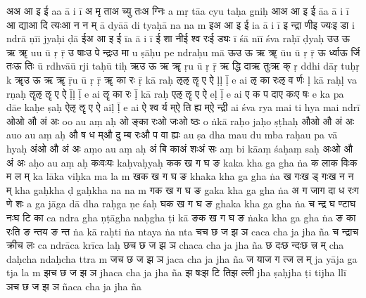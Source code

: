 \documentclass{article}
\begin{document}
\card
{अ}{अ आ इ ई}%
{a}{a ā i ī}
{{अ मृ ता}{अ च्यु तः}{अ ग्निः}}%
{{a mṛ tā}{a cyu taḥ}{a gniḥ}}
\card
{आ}{अ आ इ ई}%
{ā}{a ā i ī}
{{आ द्या}{आ दि त्यः}{आ न न म्}}%
{{ā dyā}{ā di tyaḥ}{ā na na m}}
\card
{इ}{अ आ इ ई}%
{i}{a ā i ī}
{{इ न्द्रा णी}{इ ज्यः}{इ डा}}%
{{i ndrā ṇī}{i jyaḥ}{i ḍā}}
\card
{ई}{अ आ इ ई}%
{ī}{a ā i ī}
{{ई शा नी}{ई श्व रः}{ई ड्यः}}%
{{ī śā nī}{ī śva raḥ}{ī ḍyaḥ}}
\card
{उ}{उ ऊ ऋ ॠ}%
{u}{u ū ṛ ṝ}
{{उ षाः}{उ पे न्द्रः}{उ मा}}%
{{u ṣāḥ}{u pe ndraḥ}{u mā}}
\card
{ऊ}{उ ऊ ऋ ॠ}%
{ū}{u ū ṛ ṝ}
{{ऊ र्ध्वा}{ऊ र्जि तः}{ऊ तिः}}%
{{ū rdhvā}{ū rji taḥ}{ū tiḥ}}
\card
{ऋ}{उ ऊ ऋ ॠ}%
{ṛ}{u ū ṛ ṝ}
{{ऋ द्धि दा}{ऋ तुः}{ऋ क्}}%
{{ṛ ddhi dā}{ṛ tuḥ}{ṛ k}}
\card
{ॠ}{उ ऊ ऋ ॠ}%
{ṝ}{u ū ṛ ṝ}
{{ॠ का रः}{ }{ }}%
{{ṝ kā raḥ}{ }{ }}
\card
{ऌ}{ऌ ॡ ए ऐ}%
{ḷ}{ḷ ḹ e ai}
{{ऌ का रः}{ऌ व र्णः}{ }}%
{{ḷ kā raḥ}{ḷ va rṇaḥ}{ }}
\card
{ॡ}{ऌ ॡ ए ऐ}%
{ḹ}{ḷ ḹ e ai}
{{ॡ का रः}{ }{ }}%
{{ḹ kā raḥ}{ }{ }}
\card
{ए}{ऌ ॡ ए ऐ}%
{e}{ḷ ḹ e ai}
{{ए क प दा}{ए कः}{ए षः}}%
{{e ka pa dā}{e kaḥ}{e ṣaḥ}}
\card
{ऐ}{ऌ ॡ ए ऐ}%
{ai}{ḷ ḹ e ai}
{{ऐ श्व र्य म्}{ऐ ति ह्य म्}{ऐ न्द्री}}%
{{ai śva rya m}{ai ti hya m}{ai ndrī}}
\card
{ओ}{ओ औ अं अः}%
{o}{o au aṃ aḥ}
{{ओ ङ्का रः}{ओ जः}{ओ ष्ठः}}%
{{o ṅkā raḥ}{o jaḥ}{o ṣṭhaḥ}}
\card
{औ}{ओ औ अं अः}%
{au}{o au aṃ aḥ}
{{औ ष ध म्}{औ दु म्ब रः}{औ प वा ह्यः}}%
{{au ṣa dha m}{au du mba raḥ}{au pa vā hyaḥ}}
\card
{अं}{ओ औ अं अः}%
{aṃ}{o au aṃ aḥ}
{{अं बि का}{अं शः}{अं सः}}%
{{aṃ bi kā}{aṃ śaḥ}{aṃ saḥ}}
\card
{अः}{ओ औ अं अः}%
{aḥ}{o au aṃ aḥ}
{{कः}{वः}{यः}}%
{{kaḥ}{vaḥ}{yaḥ}}
\card
{क}{क ख ग घ ङ}%
{ka}{ka kha ga gha ṅa}
{{क ला}{क विः}{क म ल म्}}%
{{ka lā}{ka viḥ}{ka ma la m}}
\card
{ख}{क ख ग घ ङ}%
{kha}{ka kha ga gha ṅa}
{{ख गः}{ख ड् गः}{ख न न म्}}%
{{kha gaḥ}{kha ḍ gaḥ}{kha na na m}}
\card
{ग}{क ख ग घ ङ}%
{ga}{ka kha ga gha ṅa}
{{अ ग जा}{ग दा ध रः}{ग णे शः}}%
{{a ga jā}{ga dā dha raḥ}{ga ṇe śaḥ}}
\card
{घ}{क ख ग घ ङ}%
{gha}{ka kha ga gha ṅa}
{{च न्द्र घ ण्टा}{घ नः}{घ टि का}}%
{{ca ndra gha ṇṭā}{gha naḥ}{gha ṭi kā}}
\card
{ङ}{क ख ग घ ङ}%
{ṅa}{ka kha ga gha ṅa}
{{ङ का रः}{ति ङ न्त}{य ङ न्त}}%
{{ṅa kā raḥ}{ti ṅa nta}{ya ṅa nta}}
\card
{च}{च छ ज झ ञ}%
{ca}{ca cha ja jha ña}
{{च न्द्रा}{च क्री}{च लः}}%
{{ca ndrā}{ca krī}{ca laḥ}}
\card
{छ}{च छ ज झ ञ}%
{cha}{ca cha ja jha ña}
{{छ दः}{छ न्दः}{छ त्त्र म्}}%
{{cha daḥ}{cha ndaḥ}{cha ttra m}}
\card
{ज}{च छ ज झ ञ}%
{ja}{ca cha ja jha ña}
{{ज या}{ज ग त्}{ज ल म्}}%
{{ja yā}{ja ga t}{ja la m}}
\card
{झ}{च छ ज झ ञ}%
{jha}{ca cha ja jha ña}
{{झ षः}{झ टि ति}{झ ल्ली}}%
{{jha ṣaḥ}{jha ṭi ti}{jha llī}}
\card
{ञ}{च छ ज झ ञ}%
{ña}{ca cha ja jha ña}
\end{document}

